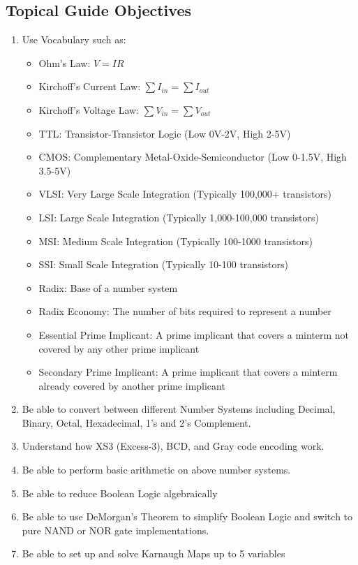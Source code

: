 \documentclass[12pt]{article}
\begin{document}
\subsection{Topical Guide Objectives}
\begin{enumerate}
	\item Use Vocabulary such as:
	      \begin{itemize}
		      \item Ohm's Law: $V = IR$
		      \item Kirchoff's Current Law: $\sum I_{in} = \sum I_{out}$
		      \item Kirchoff's Voltage Law: $\sum V_{in} = \sum V_{out}$
		      \item TTL: Transistor-Transistor Logic (Low 0V-2V, High 2-5V)
		      \item CMOS: Complementary Metal-Oxide-Semiconductor (Low 0-1.5V, High 3.5-5V)
		      \item VLSI: Very Large Scale Integration (Typically 100,000+
		            transistors)
		      \item LSI: Large Scale Integration (Typically 1,000-100,000
		            transistors)
		      \item MSI: Medium Scale Integration (Typically 100-1000
		            transistors)
		      \item SSI: Small Scale Integration (Typically 10-100 transistors)
		      \item Radix: Base of a number system
		      \item Radix Economy: The number of bits required to represent a number
		      \item Essential Prime Implicant: A prime implicant that covers a
		            minterm not covered by any other prime implicant
		      \item Secondary Prime Implicant: A prime implicant that covers a
		            minterm already covered by another prime implicant
	      \end{itemize}
	\item Be able to convert between different Number Systems including
	      Decimal, Binary, Octal, Hexadecimal, 1's and 2's Complement.
	\item Understand how XS3 (Excess-3), BCD, and Gray code encoding work.
	\item Be able to perform basic arithmetic on above number systems.
	\item Be able to reduce Boolean Logic algebraically
	\item Be able to use DeMorgan's Theorem to simplify Boolean Logic and switch
	      to pure NAND or NOR gate implementations.
	\item Be able to set up and solve Karnaugh Maps up to 5 variables
\end{enumerate}
\end{document}
